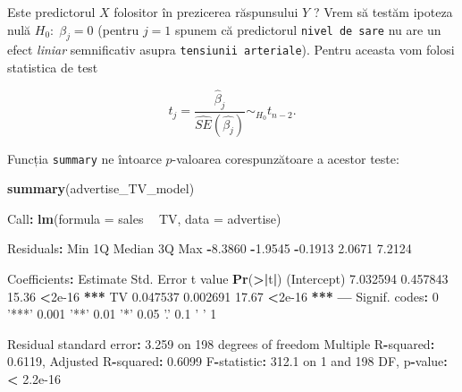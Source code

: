 \documentclass[]{article}
\newenvironment{Shaded}{\begin{snugshade}}{\end{snugshade}}
\newcommand{\KeywordTok}[1]{\textcolor[rgb]{0.13,0.29,0.53}{\textbf{#1}}}
\newcommand{\DataTypeTok}[1]{\textcolor[rgb]{0.13,0.29,0.53}{#1}}
\newcommand{\DecValTok}[1]{\textcolor[rgb]{0.00,0.00,0.81}{#1}}
\newcommand{\FloatTok}[1]{\textcolor[rgb]{0.00,0.00,0.81}{#1}}
\newcommand{\StringTok}[1]{\textcolor[rgb]{0.31,0.60,0.02}{#1}}
\newcommand{\OperatorTok}[1]{\textcolor[rgb]{0.81,0.36,0.00}{\textbf{#1}}}
\newcommand{\ErrorTok}[1]{\textcolor[rgb]{0.64,0.00,0.00}{\textbf{#1}}}
\newcommand{\NormalTok}[1]{#1}
\begin{document}
Este predictorul \(X\) folositor în prezicerea răspunsului \(Y\) ? Vrem
să testăm ipoteza nulă \(H_0:\;\beta_j=0\) (pentru \(j=1\) spunem că
predictorul \texttt{nivel\ de\ sare} nu are un efect \emph{liniar}
semnificativ asupra \texttt{tensiunii\ arteriale}). Pentru aceasta vom
folosi statistica de test

\[
t_j = \frac{\hat{\beta}_j}{\hat{SE}(\hat{\beta_j})}\sim_{H_0} t_{n-2}.
\]

Funcția \texttt{summary} ne întoarce \(p\)-valoarea corespunzătoare a
acestor teste:

\begin{Shaded}
\begin{Highlighting}[]
\KeywordTok{summary}\NormalTok{(advertise_TV_model)}

\NormalTok{Call}\OperatorTok{:}
\KeywordTok{lm}\NormalTok{(}\DataTypeTok{formula =}\NormalTok{ sales }\OperatorTok{~}\StringTok{ }\NormalTok{TV, }\DataTypeTok{data =}\NormalTok{ advertise)}

\NormalTok{Residuals}\OperatorTok{:}
\StringTok{    }\NormalTok{Min      1Q  Median      3Q     Max }
\OperatorTok{-}\FloatTok{8.3860} \OperatorTok{-}\FloatTok{1.9545} \OperatorTok{-}\FloatTok{0.1913}  \FloatTok{2.0671}  \FloatTok{7.2124} 

\NormalTok{Coefficients}\OperatorTok{:}
\StringTok{            }\NormalTok{Estimate Std. Error t value }\KeywordTok{Pr}\NormalTok{(}\OperatorTok{>}\ErrorTok{|}\NormalTok{t}\OperatorTok{|}\NormalTok{)    }
\NormalTok{(Intercept) }\FloatTok{7.032594}   \FloatTok{0.457843}   \FloatTok{15.36}   \OperatorTok{<}\FloatTok{2e-16} \OperatorTok{**}\ErrorTok{*}
\NormalTok{TV          }\FloatTok{0.047537}   \FloatTok{0.002691}   \FloatTok{17.67}   \OperatorTok{<}\FloatTok{2e-16} \OperatorTok{**}\ErrorTok{*}
\OperatorTok{---}
\NormalTok{Signif. codes}\OperatorTok{:}\StringTok{  }\DecValTok{0} \StringTok{'***'} \FloatTok{0.001} \StringTok{'**'} \FloatTok{0.01} \StringTok{'*'} \FloatTok{0.05} \StringTok{'.'} \FloatTok{0.1} \StringTok{' '} \DecValTok{1}

\NormalTok{Residual standard error}\OperatorTok{:}\StringTok{ }\FloatTok{3.259}\NormalTok{ on }\DecValTok{198}\NormalTok{ degrees of freedom}
\NormalTok{Multiple R}\OperatorTok{-}\NormalTok{squared}\OperatorTok{:}\StringTok{  }\FloatTok{0.6119}\NormalTok{,    Adjusted R}\OperatorTok{-}\NormalTok{squared}\OperatorTok{:}\StringTok{  }\FloatTok{0.6099} 
\NormalTok{F}\OperatorTok{-}\NormalTok{statistic}\OperatorTok{:}\StringTok{ }\FloatTok{312.1}\NormalTok{ on }\DecValTok{1}\NormalTok{ and }\DecValTok{198}\NormalTok{ DF,  p}\OperatorTok{-}\NormalTok{value}\OperatorTok{:}\StringTok{ }\ErrorTok{<}\StringTok{ }\FloatTok{2.2e-16}
\end{Highlighting}
\end{Shaded}
\end{document}
